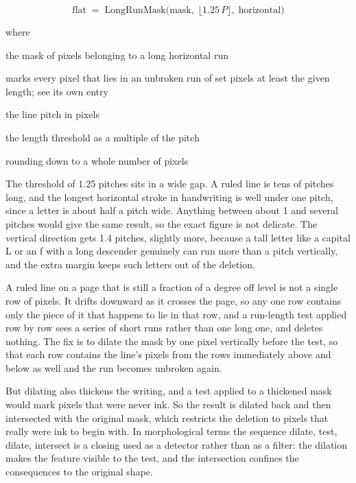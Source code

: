 \begin{equation}
\mathrm{flat} \;=\; \mathrm{LongRunMask}\big(\mathrm{mask},\; \lfloor 1.25\,P \rfloor,\;\text{horizontal}\big)
\end{equation}

\noindent where
\begin{description}[leftmargin=2.4em,style=nextline,font=\normalfont\ttfamily]\setlength\itemsep{1pt}
  \item[{$\mathrm{flat}$}] \normalfont the mask of pixels belonging to a long horizontal run
  \item[{$\mathrm{LongRunMask}$}] \normalfont marks every pixel that lies in an unbroken run of set pixels at least the given length; see its own entry
  \item[{$P$}] \normalfont the line pitch in pixels
  \item[{$1.25$}] \normalfont the length threshold as a multiple of the pitch
  \item[{$\lfloor \cdot \rfloor$}] \normalfont rounding down to a whole number of pixels
\end{description}
The threshold of 1.25 pitches sits in a wide gap. A ruled line is tens of pitches long, and the longest horizontal stroke in handwriting is well under one pitch, since a letter is about half a pitch wide. Anything between about 1 and several pitches would give the same result, so the exact figure is not delicate. The vertical direction gets 1.4 pitches, slightly more, because a tall letter like a capital L or an f with a long descender genuinely can run more than a pitch vertically, and the extra margin keeps such letters out of the deletion.


A ruled line on a page that is still a fraction of a degree off level is not a single row of pixels. It drifts downward as it crosses the page, so any one row contains only the piece of it that happens to lie in that row, and a run-length test applied row by row sees a series of short runs rather than one long one, and deletes nothing. The fix is to dilate the mask by one pixel vertically before the test, so that each row contains the line's pixels from the rows immediately above and below as well and the run becomes unbroken again.

But dilating also thickens the writing, and a test applied to a thickened mask would mark pixels that were never ink. So the result is dilated back and then intersected with the original mask, which restricts the deletion to pixels that really were ink to begin with. In morphological terms the sequence dilate, test, dilate, intersect is a closing used as a detector rather than as a filter: the dilation makes the feature visible to the test, and the intersection confines the consequences to the original shape.

